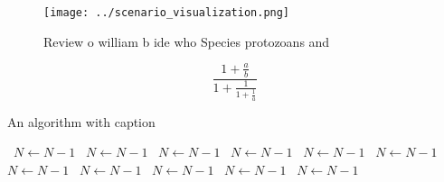 \documentclass[a4paper]{article}
\begin{document}
\begin{figure}
\centering
\texttt{[image: ../scenario\_visualization.png]}
\caption{Review o william b ide who Species protozoans and
}
\end{figure}
 
\[ \frac{1+\frac{a}{b}}{1+\frac{1}{1+\frac{1}{a}}} \]

\begin{algorithm}
\caption{An algorithm with caption}
\begin{algorithmic}
\    \State $N \gets N - 1$
\    \State $N \gets N - 1$
\    \State $N \gets N - 1$
\    \State $N \gets N - 1$
\    \State $N \gets N - 1$
\    \State $N \gets N - 1$
\    \State $N \gets N - 1$
\    \State $N \gets N - 1$
\    \State $N \gets N - 1$
\    \State $N \gets N - 1$
\    \State $N \gets N - 1$
\EndWhile
\end{algorithmic}
\end{algorithm}
\end{document}
